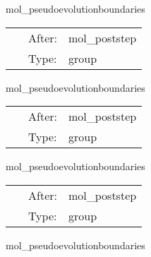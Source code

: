 \hspace{5mm} mol\_pseudoevolutionboundaries 

\hspace{5mm}{\it apply boundary conditions to pseudo-evolved quantities } 


\hspace{5mm}

 \begin{tabular*}{160mm}{cll} 
~ & After:  & mol\_poststep \\ 
~ & Type:  & group \\ 
\end{tabular*} 


\vspace{5mm}


\hspace{5mm} mol\_pseudoevolutionboundaries 

\hspace{5mm}{\it apply boundary conditions to pseudo-evolved quantities } 


\hspace{5mm}

 \begin{tabular*}{160mm}{cll} 
~ & After:  & mol\_poststep \\ 
~ & Type:  & group \\ 
\end{tabular*} 


\vspace{5mm}


\hspace{5mm} mol\_pseudoevolutionboundaries 

\hspace{5mm}{\it apply boundary conditions to pseudo-evolved quantities } 


\hspace{5mm}

 \begin{tabular*}{160mm}{cll} 
~ & After:  & mol\_poststep \\ 
~ & Type:  & group \\ 
\end{tabular*} 


\vspace{5mm}


\hspace{5mm} mol\_pseudoevolutionboundaries 

